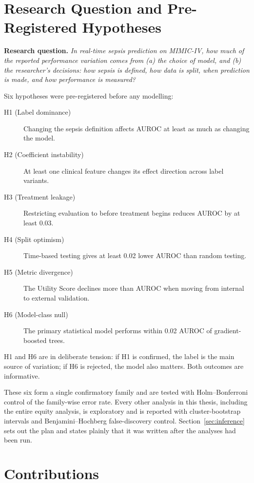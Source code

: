 \section{Research Question and Pre-Registered Hypotheses}
\label{sec:rq}

\noindent\textbf{Research question.} \textit{In real-time sepsis prediction on
MIMIC-IV, how much of the reported performance variation comes from (a) the
choice of model, and (b) the researcher's decisions: how sepsis is defined,
    how data is split, when prediction is made, and how performance is measured?}

Six hypotheses were pre-registered before any modelling:

\begin{description}
    \item[H1 (Label dominance)] Changing the sepsis definition affects AUROC at
    least as much as changing the model.
    \item[H2 (Coefficient instability)] At least one clinical feature changes its
    effect direction across label variants.
    \item[H3 (Treatment leakage)] Restricting evaluation to before treatment
    begins reduces AUROC by at least 0.03.
    \item[H4 (Split optimism)] Time-based testing gives at least 0.02 lower AUROC
    than random testing.
    \item[H5 (Metric divergence)] The Utility Score declines more than AUROC when
    moving from internal to external validation.
    \item[H6 (Model-class null)] The primary statistical model performs within 0.02
    AUROC of gradient-boosted trees.
\end{description}

H1 and H6 are in deliberate tension: if H1 is confirmed, the label is the main
source of variation; if H6 is rejected, the model also matters. Both outcomes
are informative.

These six form a single confirmatory family and are tested with
Holm--Bonferroni control of the family-wise error rate. Every other analysis in
this thesis, including the entire equity analysis, is exploratory and is
reported with cluster-bootstrap intervals and Benjamini--Hochberg
false-discovery control. Section~\ref{sec:inference} sets out the plan and
states plainly that it was written after the analyses had been run.


\section{Contributions}
\label{sec:contrib}

